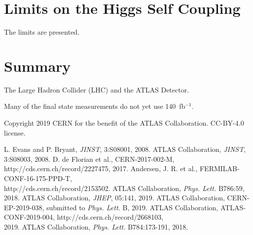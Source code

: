 \documentclass{moriond}
\begin{document}
\section{Limits on the Higgs Self Coupling} \label{sec:hh}

The limits are presented.

\section{Summary}

The Large Hadron Collider (LHC) \cite{Evans:2008zzb} and the ATLAS Detector.

Many of the final state measurements do not yet use 140~fb$^{-1}$.

\phantom{.}

\noindent
Copyright 2019 CERN for the benefit of the ATLAS Collaboration. CC-BY-4.0 license.

\begin{thebibliography}{99}
 L. Evans and P. Bryant, {\em JINST}, 3:S08001, 2008.
 ATLAS Collaboration, {\em JINST}, 3:S08003, 2008.
 D. de Florian et al., CERN-2017-002-M, http://cds.cern.ch/record/2227475, 2017.
 Andersen, J. R. et al., FERMILAB-CONF-16-175-PPD-T,\\ http://cds.cern.ch/record/2153502.
 ATLAS Collaboration, {\em Phys. Lett.} B786:59, 2018.
 ATLAS Collaboration, {\em JHEP}, 05:141, 2019.
 ATLAS Collaboration, CERN-EP-2019-038, submitted to {\em Phys. Lett.} B, 2019.
 ATLAS Collaboration, ATLAS-CONF-2019-004, http://cds.cern.ch/record/2668103,\\ 2019.
 ATLAS Collaboration, {\em Phys. Lett.} B784:173-191, 2018.
\end{thebibliography}


\end{document}
